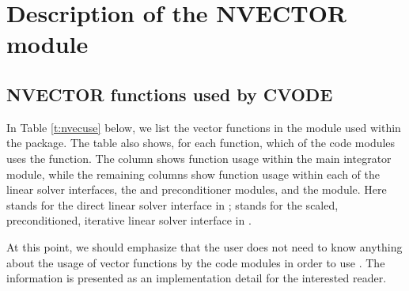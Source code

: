 \chapter{Description of the NVECTOR module}\label{s:nvector}



\section{NVECTOR functions used by CVODE}

In Table \ref{t:nvecuse} below, we list the vector functions in the 
{\nvector} module used within the {\cvode} package.
The table also shows, for each function, which of the code modules uses
the function. The {\cvode} column shows function usage within the main
integrator module, while the remaining columns show function usage
within each of the {\cvode} linear solver interfaces, the {\cvbandpre} and
{\cvbbdpre} preconditioner modules, and the {\fcvode} module.  Here
{\cvdls} stands for the direct linear solver interface in {\cvode};
{\cvspils} stands for the scaled, preconditioned, iterative linear
solver interface in {\cvode}.

At this point, we should emphasize that the {\cvode} user does not need to know 
anything about the usage of vector functions by the {\cvode} code modules in order 
to use {\cvode}. The information is presented as an implementation detail for the 
interested reader.

